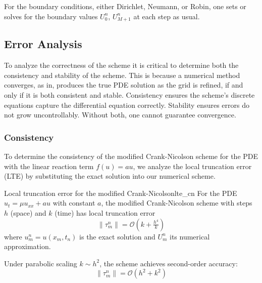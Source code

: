 
For the boundary conditions, either Dirichlet, Neumann, or Robin, one sets or solves for the boundary
values \(U_0^n\), \(U_{M+1}^n\) at each step as usual.

\subsection{Error Analysis}
To analyze the correctness of the scheme it is critical to determine both the consistency and stability of the
scheme. This is because a numerical method converges, as in, produces the true PDE solution as the grid is refined,
if and only if it is both consistent and stable. Consistency ensures the scheme’s discrete equations capture
the differential equation correctly. Stability ensures errors do not grow uncontrollably. Without both, one cannot
guarantee convergence.


\subsubsection{Consistency}
To determine the consistency of the modified Crank-Nicolson scheme for the PDE with the linear reaction term
$f(u) = au$, we analyze the local truncation error (LTE) by substituting the exact solution into our
numerical scheme.

\begin{theorem}{Local truncation error for the modified Crank-Nicolson}{lte_cn}
  For the PDE $u_t = \mu u_{xx} + au$ with constant $a$, the modified Crank-Nicolson scheme with steps $h$ (space)
  and $k$ (time) has local truncation error
  \[
    \|\tau_m^n\| = \mathcal{O}\!\left(k +\tfrac{h^4}{k}\right)
  \]
  where $u_m^n = u(x_m,t_n)$ is the exact solution and $U_m^n$ its numerical approximation.

  Under parabolic scaling $k \sim h^2$, the scheme achieves second-order accuracy:
  \[
    \|\tau_m^n\| = \mathcal{O}\!\left(h^2 + k^2\right)
  \]
\end{theorem}


